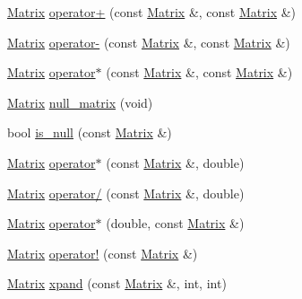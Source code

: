 \begin{DoxyCompactItemize}
\item 
\hyperlink{classchittmatrix_1_1Matrix}{\-Matrix} \hyperlink{classchittmatrix_1_1Matrix_a6d11ed998cc31f97481d26e07afa66d8}{operator+} (const \hyperlink{classchittmatrix_1_1Matrix}{\-Matrix} \&, const \hyperlink{classchittmatrix_1_1Matrix}{\-Matrix} \&)
\item 
\hyperlink{classchittmatrix_1_1Matrix}{\-Matrix} \hyperlink{classchittmatrix_1_1Matrix_a9ed5b2e849ee4b8282934405339fd7a1}{operator-\/} (const \hyperlink{classchittmatrix_1_1Matrix}{\-Matrix} \&, const \hyperlink{classchittmatrix_1_1Matrix}{\-Matrix} \&)
\item 
\hyperlink{classchittmatrix_1_1Matrix}{\-Matrix} \hyperlink{classchittmatrix_1_1Matrix_adf38db67cba468ce4b579a29b568aa5b}{operator$\ast$} (const \hyperlink{classchittmatrix_1_1Matrix}{\-Matrix} \&, const \hyperlink{classchittmatrix_1_1Matrix}{\-Matrix} \&)
\item 
\hyperlink{classchittmatrix_1_1Matrix}{\-Matrix} \hyperlink{classchittmatrix_1_1Matrix_a853635295a3a5ee1479dbaeace7e7d5f}{null\-\_\-matrix} (void)
\item 
bool \hyperlink{classchittmatrix_1_1Matrix_ad43fc2b9436b8dff4587ba7156b79d1c}{is\-\_\-null} (const \hyperlink{classchittmatrix_1_1Matrix}{\-Matrix} \&)
\item 
\hyperlink{classchittmatrix_1_1Matrix}{\-Matrix} \hyperlink{classchittmatrix_1_1Matrix_a40932f59a1546ce6d3826019a05bab6b}{operator$\ast$} (const \hyperlink{classchittmatrix_1_1Matrix}{\-Matrix} \&, double)
\item 
\hyperlink{classchittmatrix_1_1Matrix}{\-Matrix} \hyperlink{classchittmatrix_1_1Matrix_afe8aa28ee4ef3b51c41384487bb9ba02}{operator/} (const \hyperlink{classchittmatrix_1_1Matrix}{\-Matrix} \&, double)
\item 
\hyperlink{classchittmatrix_1_1Matrix}{\-Matrix} \hyperlink{classchittmatrix_1_1Matrix_a492b39cef7e644e988bae3f2688d6c4a}{operator$\ast$} (double, const \hyperlink{classchittmatrix_1_1Matrix}{\-Matrix} \&)
\item 
\hyperlink{classchittmatrix_1_1Matrix}{\-Matrix} \hyperlink{classchittmatrix_1_1Matrix_ab412dd1bebfeb5bf47f23e4da4468efa}{operator!} (const \hyperlink{classchittmatrix_1_1Matrix}{\-Matrix} \&)
\item 
\hyperlink{classchittmatrix_1_1Matrix}{\-Matrix} \hyperlink{classchittmatrix_1_1Matrix_a5e7ddcedc879fd208902ad910186f3c2}{xpand} (const \hyperlink{classchittmatrix_1_1Matrix}{\-Matrix} \&, int, int)

\end{DoxyCompactItemize}
